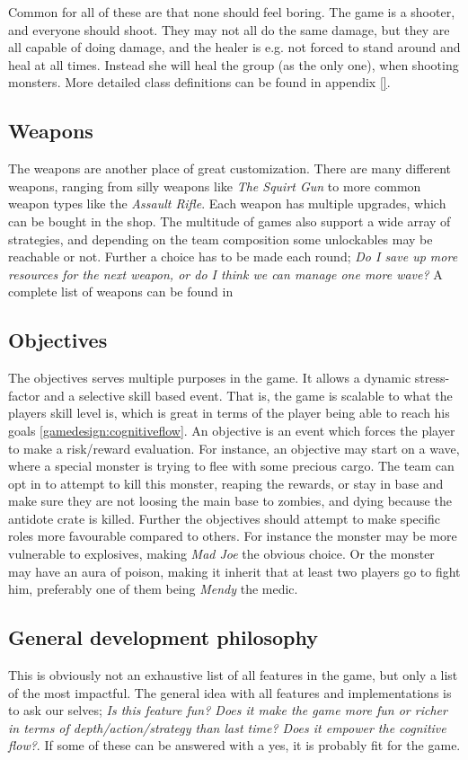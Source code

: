 Common for all of these are that none should feel boring. The game is a shooter, and everyone should shoot. They may not all do the same damage, but they are all capable of doing damage, and the healer is e.g. not forced to stand around and heal at all times. Instead she will heal the group (as the only one), when shooting monsters. More detailed class definitions can be found in appendix \ref{}. 

\subsection*{Weapons}\label{gamedesign:ourgame:weapons}
The weapons are another place of great customization. There are many different weapons, ranging from silly weapons like \emph{The Squirt Gun} to more common weapon types like the \emph{Assault Rifle}. Each weapon has multiple upgrades, which can be bought in the shop. The multitude of games also support a wide array of strategies, and depending on the team composition some unlockables may be reachable or not. Further a choice has to be made each round; \emph{Do I save up more resources for the next weapon, or do I think we can manage one more wave?} A complete list of weapons can be found in \appendix{} 

\subsection*{Objectives}\label{gamedesign:ourgame:objectives}
The objectives serves multiple purposes in the game. It allows a dynamic stress-factor and a selective skill based event. That is, the game is scalable to what the players skill level is, which is great in terms of the player being able to reach his goals \ref{gamedesign:cognitiveflow}. An objective is an event which forces the player to make a risk/reward evaluation. For instance, an objective may start on a wave, where a special monster is trying to flee with some precious cargo. The team can opt in to attempt to kill this monster, reaping the rewards, or stay in base and make sure they are not loosing the main base to zombies, and dying because the antidote crate is killed. Further the objectives should attempt to make specific roles more favourable compared to others. For instance the monster may be more vulnerable to explosives, making \emph{Mad Joe} the obvious choice. Or the monster may have an aura of poison, making it inherit that at least two players go to fight him, preferably one of them being \emph{Mendy} the medic. 

\subsection*{General development philosophy}
This is obviously not an exhaustive list of all features in the game, but only a list of the most impactful. The general idea with all features and implementations is to ask our selves; \emph{Is this feature fun? Does it make the game more fun or richer in terms of depth/action/strategy than last time? Does it empower the cognitive flow?}. If some of these can be answered with a yes, it is probably fit for the game. 
